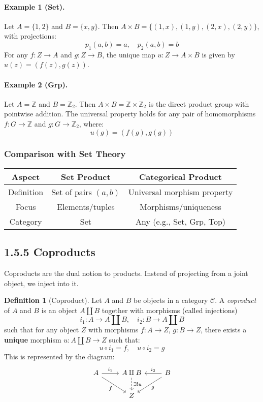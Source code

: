 \documentclass[10pt]{article}
\theoremstyle{plain}
\theoremstyle{definition}
\newtheorem{definition}{Definition}[section]
\begin{document}
  \paragraph{Example 1 (Set).}
  Let $A = \{1, 2\}$ and $B = \{x, y\}$. Then $A \times B = \{(1,x), (1,y), (2,x), (2,y)\}$, with projections:
  \[
  p_1(a, b) = a,\quad p_2(a, b) = b
  \]
  For any $f : Z \to A$ and $g : Z \to B$, the unique map $u : Z \to A \times B$ is given by $u(z) = (f(z), g(z))$.
  
  \paragraph{Example 2 (Grp).}
  Let $A = \mathbb{Z}$ and $B = \mathbb{Z}_2$. Then $A \times B = \mathbb{Z} \times \mathbb{Z}_2$ is the direct product group with pointwise addition. The universal property holds for any pair of homomorphisms $f : G \to \mathbb{Z}$ and $g : G \to \mathbb{Z}_2$, where:
  \[
  u(g) = (f(g), g(g))
  \]
  
  \subsubsection*{Comparison with Set Theory}
  \begin{center}
  	\begin{tabular}{|c|c|c|}
  		\hline
  		\textbf{Aspect} & \textbf{Set Product} & \textbf{Categorical Product} \\
  		\hline
  		Definition & Set of pairs $(a,b)$ & Universal morphism property \\
  		\hline
  		Focus & Elements/tuples & Morphisms/uniqueness \\
  		\hline
  		Category & Set & Any (e.g., Set, Grp, Top) \\
  		\hline
  	\end{tabular}
  \end{center}
  
  \subsection*{1.5.5 Coproducts}
  
  Coproducts are the dual notion to products. Instead of projecting from a joint object, we inject into it.
  
  \begin{definition}[Coproduct]
  	Let $A$ and $B$ be objects in a category $\mathcal{C}$. A \emph{coproduct} of $A$ and $B$ is an object $A \amalg B$ together with morphisms (called injections)
  	\[
  	i_1 : A \to A \amalg B,\quad i_2 : B \to A \amalg B
  	\]
  	such that for any object $Z$ with morphisms $f : A \to Z$, $g : B \to Z$, there exists a \textbf{unique} morphism $u : A \amalg B \to Z$ such that:
  	\[
  	u \circ i_1 = f,\quad u \circ i_2 = g
  	\]
  	This is represented by the diagram:
  	\[
  	\begin{tikzcd}
  		A \arrow[r, "i_1"] \arrow[dr, "f"'] & A \amalg B \arrow[d, dashed, "\exists! u"] & B \arrow[l, "i_2"'] \arrow[dl, "g"] \\
  		& Z &
  	\end{tikzcd}
  	\]
  \end{definition}
  
\end{document}
